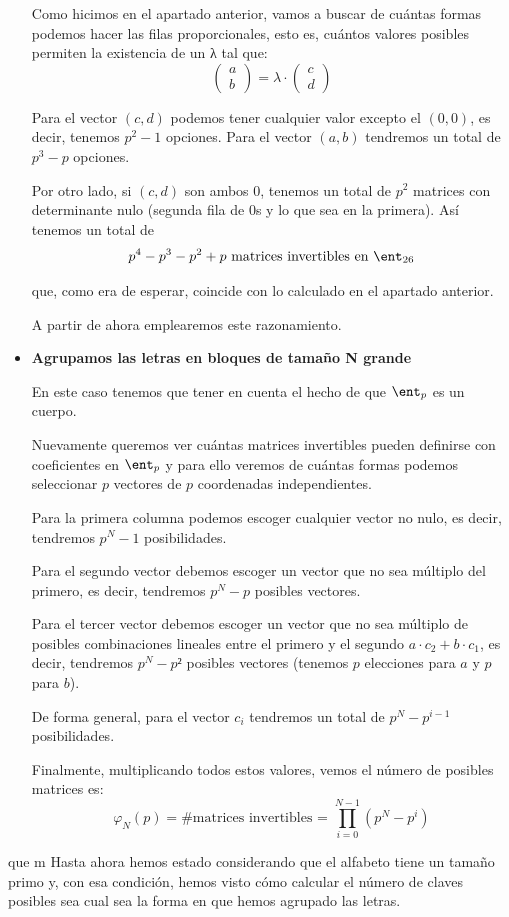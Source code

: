 \begin{itemize}
\begin{remark}
Como hicimos en el apartado anterior, vamos a buscar de cuántas formas podemos hacer las filas proporcionales, esto es, cuántos valores posibles permiten la existencia de un λ tal que:
\[\left( \begin{array}{c}
a \\
b  \end{array} \right) = λ \cdot \left( \begin{array}{c}
c \\
d  \end{array} \right)\]

Para el vector $(c,d)$ podemos tener cualquier valor excepto el $(0,0)$, es decir, tenemos $p^2 -1$ opciones. Para el vector $(a,b)$ tendremos un total de $p^3-p$ opciones.

Por otro lado, si $(c,d)$ son ambos $0$, tenemos un total de $p^2$ matrices con determinante nulo (segunda fila de 0s y lo que sea en la primera). Así tenemos un total de
\[p^4 - p^3 -p^2+p \text{ matrices invertibles en } \ent_{26}\]

que, como era de esperar, coincide con lo calculado en el apartado anterior.

A partir de ahora emplearemos este razonamiento.
\end{remark}
\item \textbf{Agrupamos las letras en bloques de tamaño N grande}

En este caso tenemos que tener en cuenta el hecho de que $\ent_p$ es un cuerpo.

Nuevamente queremos ver cuántas matrices invertibles pueden definirse con coeficientes en $\ent_p$ y para ello veremos de cuántas formas podemos seleccionar $p$ vectores de $p$ coordenadas independientes.

Para la primera columna podemos escoger cualquier vector no nulo, es decir, tendremos $p^N-1$ posibilidades.

Para el segundo vector debemos escoger un vector que no sea múltiplo del primero, es decir, tendremos $p^N-p$ posibles vectores.

Para el tercer vector debemos escoger un vector que no sea múltiplo de posibles combinaciones lineales entre el primero y el segundo $a·c_2 + b·c_1$, es decir, tendremos $p^N - p²$ posibles vectores (tenemos $p$ elecciones para $a$ y $p$ para $b$).

De forma general, para el vector $c_i$ tendremos un total de $p^N-p^{i-1}$ posibilidades.

Finalmente, multiplicando todos estos valores, vemos el número de posibles matrices es:
\[ φ_N(p) = \text{\# matrices invertibles = }\prod_{i=0}^{N-1} (p^N-p^i)\]
\end{itemize}
que m
Hasta ahora hemos estado considerando que el alfabeto tiene un tamaño primo y, con esa condición, hemos visto cómo calcular el número de claves posibles sea cual sea la forma en que hemos agrupado las letras.

